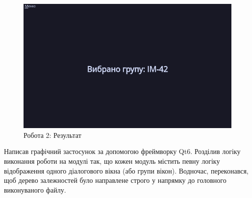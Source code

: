 \begin{figure}[pt]
  \center\includegraphics[width=0.7\linewidth]{action2_result.png}
	\caption{Робота 2: Результат}
\end{figure}

\pagebreak

\conclusion%
Написав графічний застосунок за допомогою фреймворку Qt6.
Розділив логіку виконання роботи на модулі так, що кожен модуль містить певну
логіку відображення одного діалогового вікна (або групи вікон). Водночас,
переконався, щоб дерево залежностей було направлене строго у напрямку до
головного виконуваного файлу.


